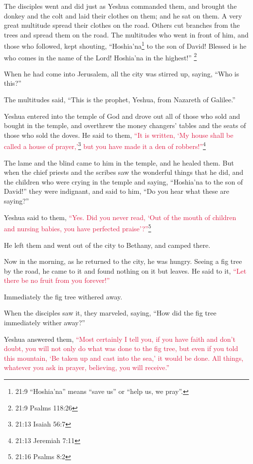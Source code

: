 \myverse{}The disciples went and did just as Yeshua commanded them,
\myverse{}and brought the donkey and the colt and laid their clothes on them; and he
sat on them.
\myverse{}A very great multitude spread their clothes on the road. Others cut branches
from the trees and spread them on the road.
\myverse{}The multitudes who went in front of him, and those who followed, kept shouting,
“Hoshia'na\footnote{21:9 “Hoshia'na” means “save us” or “help us, we pray”.} to the son of David! Blessed is he
who comes in the name of the Lord! Hoshia'na in the highest!”
\footnote{21:9 Psalms 118:26}

\myverse{}When he had come into Jerusalem, all the city was stirred up,
saying, “Who is this?”

\myverse{}The multitudes said, “This is the prophet, Yeshua, from Nazareth
of Galilee.”

\myverse{}Yeshua entered into the temple of God and drove out all of those
who sold and bought in the temple, and overthrew the money changers’ tables and the seats of those who
sold the doves.
\myverse{}He said to them,
\textcolor{crimson}{“It is written, ‘My house shall be called a house of prayer,’}\footnote{21:13 Isaiah 56:7}
\textcolor{crimson}{but you have made it a den of robbers!”}\footnote{21:13 Jeremiah 7:11}

\myverse{}The lame and the blind came to him in the temple, and he healed
them.
\myverse{}But when the chief priests and the scribes saw the wonderful things that
he did, and the children who were crying in the temple and saying, “Hoshia'na to the son of David!” they
were indignant,
\myverse{}and said to him, “Do you hear what these are saying?”

Yeshua said to them,
\textcolor{crimson}{“Yes. Did you never read, ‘Out of the mouth of children and nursing babies, you have perfected praise’?”}\footnote{21:16 Psalms 8:2}

\myverse{}He left them and went out of the city to Bethany, and camped
there.

\myverse{}Now in the morning, as he returned to the city, he was hungry.
\myverse{}Seeing a fig tree by the road, he came to it and found nothing on it but
leaves. He said to it,
\textcolor{crimson}{“Let there be no fruit from you forever!”
}

Immediately the fig tree withered away.

\myverse{}When the disciples saw it, they marveled, saying, “How did the
fig tree immediately wither away?”

\myverse{}Yeshua answered them,
\textcolor{crimson}{“Most certainly I tell you, if you have faith and don’t doubt, you will not only do what was done
	to the fig tree, but even if you told this mountain, ‘Be taken up and cast into the sea,’ it would be
	done.
}
\myverse{}\textcolor{crimson}{All things, whatever you ask in prayer, believing, you will receive.”}

